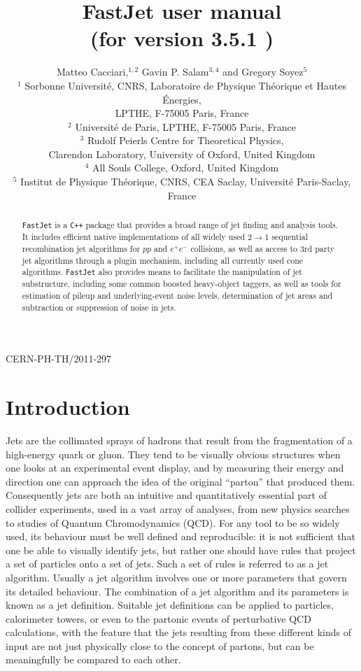 \documentclass[12pt,a4]{article}
\title{\sf FastJet user manual%
  \\ \large (for version
  3.5.1%
  )
}
\author{Matteo Cacciari,$^{1,2}$ Gavin P. Salam$^{3,4}$ and Gregory Soyez$^{5}$\\[10pt]
  \normalsize
  $^1$ Sorbonne Universit\'e, CNRS, Laboratoire de Physique Th\'eorique et Hautes
  \'Energies,\\[-5pt] \normalsize LPTHE, F-75005 Paris, France\\
    \normalsize
  $^2$ Universit\'e de Paris, LPTHE, F-75005 Paris, France\\
  \normalsize
  $^3$ Rudolf Peierls Centre for Theoretical Physics,\\[-5pt]
  \normalsize
  Clarendon Laboratory, University of Oxford, United Kingdom\\
  \normalsize
  $^4$ All Souls College, Oxford, United Kingdom\\
  \normalsize
  $^5$ Institut de Physique Th\'eorique, CNRS, CEA Saclay, Universit\'e
  Paris-Saclay, France
}
\date{}
\newcommand{\fastjet}{\texttt{FastJet}\xspace}
\newcommand{\ttt}[1]{{\small\texttt{#1}}}
\begin{document}
\maketitle

\vspace{-10cm}
\begin{flushright}
  CERN-PH-TH/2011-297
\end{flushright}
\vspace{9cm}


\begin{abstract}

  \fastjet is a \ttt{C++} package that provides a broad range of jet
  finding and analysis tools.
  It includes efficient native implementations of all widely used $2\to 1$
  sequential recombination jet algorithms for $pp$ and $e^+e^-$
  collisions, as well as access to 3rd party jet algorithms through a
  plugin mechanism, including all currently used cone algorithms.
  \fastjet also provides means to facilitate the manipulation of jet
  substructure, including some common boosted heavy-object taggers, as
  well as tools for estimation of pileup and underlying-event noise
  levels, determination of jet areas and subtraction or suppression
  of noise in jets.

\end{abstract}

\newpage
\tableofcontents
\newpage

\section{Introduction}




Jets are the collimated sprays of hadrons that result from the
fragmentation of a high-energy quark or gluon.
%
They tend to be visually obvious structures when one looks at an
experimental event display, and by measuring their energy and
direction one can approach the idea of the original ``parton'' that
produced them.
%
Consequently jets are both an intuitive and quantitatively essential
part of collider experiments, used in a vast array of analyses, from
new physics searches to studies of Quantum Chromodynamics (QCD).
%
For any tool to be so widely used, its behaviour must be well defined
and reproducible: it is not sufficient that one be able to visually
identify jets, but rather one should have rules that project a set of
particles onto a set of jets.
%
Such a set of rules is referred to as a jet algorithm.
%
Usually a jet algorithm involves one or more parameters that govern
its detailed behaviour.
%
The combination of a jet algorithm and its parameters is known as a
jet definition.
%
Suitable jet definitions can be applied to particles,
calorimeter towers, or even to the partonic events of perturbative QCD
calculations, with the feature that the jets resulting from these
different kinds of input are not just physically close to the
concept of partons, but can be meaningfully be compared to each other.
\end{document}
